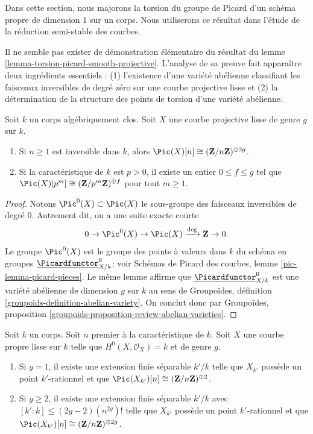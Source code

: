 \noindent
Dans cette section, nous majorons la torsion du groupe de Picard d'un schéma propre de dimension $1$ sur un corps. Nous utiliserons ce résultat dans l'étude de la réduction semi-stable des courbes.

\medskip\noindent
Il ne semble pas exister de démonstration élémentaire du résultat du lemme \ref{lemma-torsion-picard-smooth-projective}. L'analyse de sa preuve fait apparaître deux ingrédients essentiels : (1) l'existence d'une variété abélienne classifiant les faisceaux inversibles de degré zéro sur une courbe projective lisse et (2) la détermination de la structure des points de torsion d'une variété abélienne.

\begin{lemma}
\label{lemma-torsion-picard-smooth-projective}
Soit $k$ un corps algébriquement clos. Soit $X$ une courbe projective lisse de genre $g$ sur $k$. \begin{enumerate} \item Si $n \geq 1$ est inversible dans $k$, alors $\Pic(X)[n] \cong (\mathbf{Z}/n\mathbf{Z})^{\oplus 2g}$. \item Si la caractéristique de $k$ est $p > 0$, il existe un entier $0 \leq f \leq g$ tel que $\Pic(X)[p^m] \cong (\mathbf{Z}/p^m\mathbf{Z})^{\oplus f}$ pour tout $m \geq 1$.
\end{enumerate}
\end{lemma}

\begin{proof}
Notons $\Pic^0(X) \subset \Pic(X)$ le sous-groupe des faisceaux inversibles de degré $0$. Autrement dit, on a une suite exacte courte $$
0 \to \Pic^0(X) \to \Pic(X) \xrightarrow{\deg} \mathbf{Z} \to 0.
$$ Le groupe $\Pic^0(X)$ est le groupe des points à valeurs dans $k$ du schéma en groupes $\underline{\Picardfunctor}^0_{X/k}$; voir Schémas de Picard des courbes, lemme \ref{pic-lemma-picard-pieces}. Le même lemme affirme que $\underline{\Picardfunctor}^0_{X/k}$ est une variété abélienne de dimension $g$ sur $k$ au sens de Groupoïdes, définition \ref{groupoids-definition-abelian-variety}. On conclut donc par Groupoïdes, proposition \ref{groupoids-proposition-review-abelian-varieties}.
\end{proof}

\begin{lemma}
\label{lemma-torsion-picard-becomes-visible}
Soit $k$ un corps. Soit $n$ premier à la caractéristique de $k$. Soit $X$ une courbe propre lisse sur $k$ telle que $H^0(X, \mathcal{O}_X) = k$ et de genre $g$. \begin{enumerate} \item Si $g = 1$, il existe une extension finie séparable $k'/k$ telle que $X_{k'}$ possède un point $k'$-rationnel et que $\Pic(X_{k'})[n] \cong (\mathbf{Z}/n\mathbf{Z})^{\oplus 2}$. \item Si $g \geq 2$, il existe une extension finie séparable $k'/k$ avec $[k' : k] \leq (2g - 2)(n^{2g})!$ telle que $X_{k'}$ possède un point $k'$-rationnel et que $\Pic(X_{k'})[n] \cong (\mathbf{Z}/n\mathbf{Z})^{\oplus 2g}$.
\end{enumerate}
\end{lemma}

